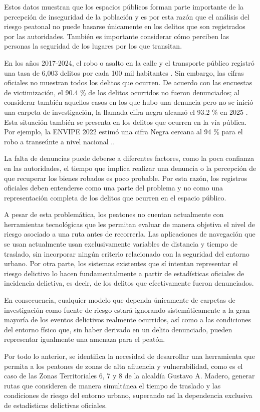 Estos datos muestran que los espacios públicos forman parte importante de la percepción de inseguridad de la población y es por esta razón que el análisis del riesgo peatonal no puede basarse únicamente en los delitos que son registrados por las autoridades. También es importante considerar cómo perciben
las personas la seguridad de los lugares por los que transitan. 

En los años 2017-2024, el robo o asalto en la calle y el transporte público registró una tasa de 6,003 delitos por cada 100 mil habitantes \cite[p. 11]{ENVIPE2025}. Sin embargo, las cifras oficiales no muestran todos los delitos que ocurren. De acuerdo con las encuestas de victimización, el 90.4 \% de los delitos ocurridos no fueron denunciados; al considerar también aquellos casos en los que hubo una denuncia pero no se inició una carpeta de investigación, la llamada cifra negra alcanzó el 93.2 \% en 2025 \cite[p. 23]{ENVIPE2025}. Esta situación también se presenta en los delitos que ocurren en la vía pública. Por ejemplo, la ENVIPE 2022 estimó una cifra Negra cercana al 94 \% para el robo a transeúnte a nivel nacional \cite{alvaro_Obregon_cifra}..

La falta de denuncias puede deberse a diferentes factores, como la poca confianza en las autoridades, el tiempo que implica realizar una denuncia o la percepción de que recuperar los bienes robados es poco probable. Por esta razón, los registros oficiales deben entenderse como una parte del problema y no como una representación completa de los delitos que ocurren en el espacio público.

A pesar de esta problemática, los peatones no cuentan actualmente con herramientas tecnológicas que les permitan evaluar de manera objetiva el nivel de riesgo asociado a una ruta antes de recorrerla. Las aplicaciones de navegación que se usan actualmente usan exclusivamente variables de distancia y tiempo de traslado, sin incorporar ningún criterio relacionado con la seguridad del entorno urbano. Por otra parte, los sistemas existentes que sí intentan representar el riesgo delictivo lo hacen fundamentalmente a partir de estadísticas oficiales de incidencia delictiva, es decir, de los delitos que efectivamente fueron denunciados.

En consecuencia, cualquier modelo que dependa únicamente de carpetas de investigación como fuente de riesgo estará ignorando sistemáticamente a la gran mayoría de los eventos delictivos realmente ocurridos, así como a las condiciones del entorno físico que, sin haber derivado en un delito denunciado, pueden representar igualmente una amenaza para el peatón.

Por todo lo anterior, se identifica la necesidad de desarrollar una herramienta que permita a los peatones de zonas de alta afluencia y vulnerabilidad, como es el caso de las Zonas Territoriales 6, 7 y 8 de la alcaldía Gustavo A. Madero, generar rutas que consideren de manera simultánea el tiempo de traslado y las condiciones de riesgo del entorno urbano, superando así la dependencia exclusiva de estadísticas delictivas oficiales.

